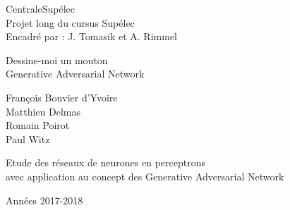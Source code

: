 
\begin{titlepage}

\setlength{\hoffset}{-1in}
\setlength{\voffset}{-1in}
\setlength{\topmargin}{1.5cm}
\setlength{\headheight}{0.5cm}
\setlength{\headsep}{1cm}
\setlength{\oddsidemargin}{3cm}
\setlength{\evensidemargin}{3cm}
\setlength{\footskip}{1.5cm}
\enlargethispage{1cm}

\fontsize{12pt}{14pt}
\selectfont

\begin{center}


\vspace{0.5cm}

CentraleSupélec\\
Projet long du cursus Supélec\\
Encadré par : J. Tomasik et A. Rimmel

\vspace{3.5cm}

\fontsize{17.28pt}{21pt}
\selectfont

Dessine-moi un mouton\\
Generative Adversarial Network

\fontsize{12pt}{14pt}
\selectfont

\vspace{.6cm}

\vspace{.4cm}

\vspace{3.5cm}

François Bouvier d'Yvoire\\
Matthieu Delmas \\
Romain Poirot \\
Paul Witz

\vspace{2cm}

Etude des réseaux de neurones en perceptrons \\ avec application au concept des Generative Adversarial Network


\vspace{1cm}

Années 2017-2018

\end{center}
\end{titlepage}
